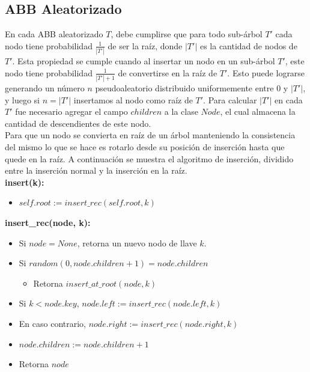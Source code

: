 \documentclass[12pt,letterpaper]{article}
\begin{document}
\subsection{ABB Aleatorizado}
En cada ABB aleatorizado $T$, debe cumplirse que para todo sub-árbol $T'$ cada nodo tiene probabilidad $\frac{1}{|T'|}$ de ser la raíz, donde $|T'|$ es la cantidad de nodos de $T'$. Esta propiedad se cumple cuando al insertar un nodo en un sub-árbol $T'$, este nodo tiene probabilidad $\frac{1}{|T'|+1}$ de convertirse en la raíz de $T'$. Esto puede lograrse generando un número $n$ pseudoaleatorio distribuido uniformemente entre 0 y $|T'|$, y luego si $n = |T'|$ insertamos al nodo como raíz de $T'$. Para calcular $|T'|$ en cada $T'$ fue necesario agregar el campo $children$ a la clase $Node$, el cual almacena la cantidad de descendientes de este nodo.\\

Para que un nodo se convierta en raíz de un árbol manteniendo la consistencia del mismo lo que se hace es rotarlo desde su posición de inserción hasta que quede en la raíz. A continuación se muestra el algoritmo de inserción, dividido entre la inserción normal y la inserción en la raíz.\\

\textbf{insert(k):}
\begin{itemize}
\item	$self.root := insert\_rec(self.root, k)$
\end{itemize}

\newpage

\textbf{insert\_rec(node, k):}
\begin{itemize}
\item	Si $node = None$, retorna un nuevo nodo de llave $k$.
\item	Si $random(0, node.children + 1) = node.children$
	\begin{itemize}
	\item	Retorna $insert\_at\_root(node, k)$
	\end{itemize}
\item	Si $k < node.key$, $node.left := insert\_rec(node.left, k)$
\item	En caso contrario, $node.right := insert\_rec(node.right, k)$
\item	$node.children := node.children + 1$
\item	Retorna $node$
\end{itemize}
\end{document}
